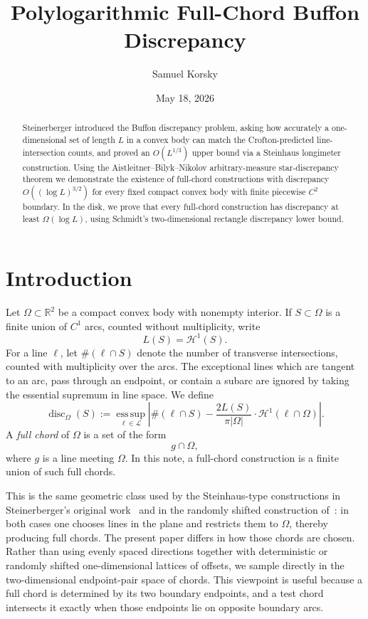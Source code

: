 \documentclass[11pt]{article}
\title{Polylogarithmic Full-Chord Buffon Discrepancy}
\author{Samuel Korsky}
\date{May 18, 2026}
\theoremstyle{definition}
\newcommand{\R}{\mathbb R}
\newcommand{\cH}{\mathcal H}
\newcommand{\cL}{\mathcal L}
\newcommand{\disc}{\operatorname{disc}}
\begin{document}
\maketitle

\begin{abstract}
\noindent
Steinerberger introduced the Buffon discrepancy problem, asking how accurately a one-dimensional set of length $L$ in a convex body can match the Crofton-predicted line-intersection counts, and proved an $O\left(L^{1/3}\right)$ upper bound via a Steinhaus longimeter construction. Using the Aistleitner--Bilyk--Nikolov arbitrary-measure star-discrepancy theorem we demonstrate the existence of full-chord constructions with discrepancy $O\left((\log L)^{3/2}\right)$ for every fixed compact convex body with finite piecewise $C^2$ boundary.  In the disk, we prove that every full-chord construction has discrepancy at least $\Omega\left(\log L\right)$, using Schmidt's two-dimensional rectangle discrepancy lower bound.
\end{abstract}

\section{Introduction}

Let $\Omega\subset\R^2$ be a compact convex body with nonempty interior.  If $S\subset\Omega$ is a finite union of $C^1$ arcs, counted without multiplicity, write
\[
        L(S)=\cH^1(S).
\]
For a line $\ell$, let $\#(\ell\cap S)$ denote the number of transverse intersections, counted with multiplicity over the arcs.  The exceptional lines which are tangent to an arc, pass through an endpoint, or contain a subarc are ignored by taking the essential supremum in line space.  We define
\[
        \disc_\Omega(S)
        :=
        \operatorname*{ess\,sup}_{\ell\in\cL}
        \left|
        \#(\ell\cap S)-
        \frac{2L(S)}{\pi|\Omega|}\cdot\cH^1(\ell\cap\Omega)
        \right|.
\]
A \emph{full chord} of $\Omega$ is a set of the form
\[
        g\cap\Omega,
\]
where $g$ is a line meeting $\Omega$.  In this note, a full-chord construction is a finite union of such full chords.

\bigskip
\noindent
This is the same geometric class used by the Steinhaus-type constructions in Steinerberger's original work~\cite{SteinerbergerBuffon} and in the randomly shifted construction of~\cite{KorskyRandomShifted}: in both cases one chooses lines in the plane and restricts them to $\Omega$, thereby producing full chords. The present paper differs in how those chords are chosen. Rather than using evenly spaced directions together with deterministic or randomly shifted one-dimensional lattices of offsets, we sample directly in the two-dimensional endpoint-pair space of chords. This viewpoint is useful because a full chord is determined by its two boundary endpoints, and a test chord intersects it exactly when those endpoints lie on opposite boundary arcs. 
\end{document}
